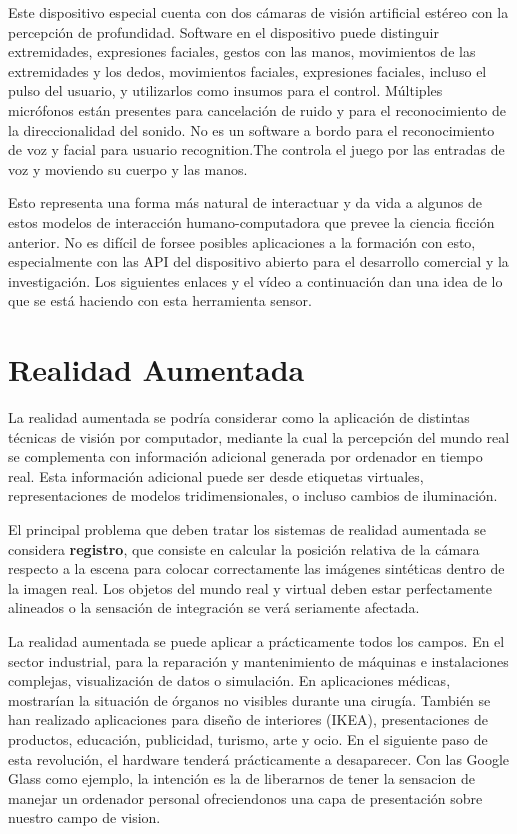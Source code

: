 Este dispositivo especial cuenta con dos cámaras de visión artificial estéreo con la percepción de profundidad. Software en el dispositivo puede distinguir extremidades, expresiones faciales, gestos con las manos, movimientos de las extremidades y los dedos, movimientos faciales, expresiones faciales, incluso el pulso del usuario, y utilizarlos como insumos para el control. Múltiples micrófonos están presentes para cancelación de ruido y para el reconocimiento de la direccionalidad del sonido. No es un software a bordo para el reconocimiento de voz y facial para usuario recognition.The controla el juego por las entradas de voz y moviendo su cuerpo y las manos.

Esto representa una forma más natural de interactuar y da vida a algunos de estos modelos de interacción humano-computadora que prevee la ciencia ficción anterior. No es difícil de forsee posibles aplicaciones a la formación con esto, especialmente con las API del dispositivo abierto para el desarrollo comercial y la investigación. Los siguientes enlaces y el vídeo a continuación dan una idea de lo que se está haciendo con esta herramienta sensor.

\section{Realidad Aumentada}
La realidad aumentada se podría considerar como la aplicación de distintas técnicas de visión por computador, mediante la cual la percepción del mundo real se complementa con información adicional generada por ordenador en tiempo real. Esta información adicional puede ser desde etiquetas virtuales, representaciones de modelos tridimensionales, o incluso cambios de iluminación. 

El principal problema que deben tratar los sistemas de realidad aumentada se considera \textbf{registro}, que consiste en calcular la posición relativa de la cámara respecto a la escena para colocar correctamente las imágenes sintéticas dentro de la imagen real. Los objetos del mundo real y virtual deben estar perfectamente alineados o la sensación de integración se verá seriamente afectada.

La realidad aumentada se puede aplicar a prácticamente todos los campos. En el sector industrial, para la reparación y mantenimiento de máquinas e instalaciones complejas, visualización de datos o simulación.  En aplicaciones médicas, mostrarían la situación de órganos no visibles durante una cirugía. También se han realizado aplicaciones para diseño de interiores (IKEA), presentaciones de productos, educación, publicidad, turismo, arte y ocio. 
En el siguiente paso de esta revolución, el hardware tenderá prácticamente a desaparecer. Con las Google Glass como ejemplo, la intención es la de liberarnos de tener la sensacion de manejar un ordenador personal ofreciendonos una capa de presentación sobre nuestro campo de vision. 

